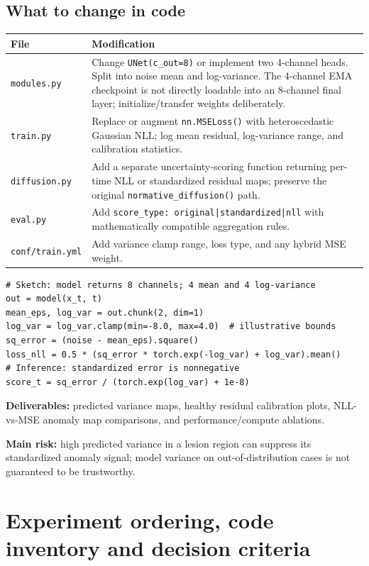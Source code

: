 \documentclass[10pt,a4paper]{article}
\newcommand{\file}[1]{\nolinkurl{#1}}
\begin{document}
\subsection{What to change in code}
\begin{tabularx}{\linewidth}{@{}p{39mm}X@{}}
\toprule File & Modification\\\midrule
\file{modules.py} & Change \file{UNet(c_out=8)} or implement two 4-channel heads. Split into noise mean and log-variance. The 4-channel EMA checkpoint is not directly loadable into an 8-channel final layer; initialize/transfer weights deliberately.\\
\file{train.py} & Replace or augment \file{nn.MSELoss()} with heteroscedastic Gaussian NLL; log mean residual, log-variance range, and calibration statistics.\\
\file{diffusion.py} & Add a separate uncertainty-scoring function returning per-time NLL or standardized residual maps; preserve the original \file{normative_diffusion()} path.\\
\file{eval.py} & Add \file{score_type: original|standardized|nll} with mathematically compatible aggregation rules.\\
\file{conf/train.yml} & Add variance clamp range, loss type, and any hybrid MSE weight.\\\bottomrule
\end{tabularx}
\begin{lstlisting}
# Sketch: model returns 8 channels; 4 mean and 4 log-variance
out = model(x_t, t)
mean_eps, log_var = out.chunk(2, dim=1)
log_var = log_var.clamp(min=-8.0, max=4.0)  # illustrative bounds
sq_error = (noise - mean_eps).square()
loss_nll = 0.5 * (sq_error * torch.exp(-log_var) + log_var).mean()
# Inference: standardized error is nonnegative
score_t = sq_error / (torch.exp(log_var) + 1e-8)
\end{lstlisting}
\textbf{Deliverables:} predicted variance maps, healthy residual calibration plots, NLL-vs-MSE anomaly map comparisons, and performance/compute ablations.\par
\textbf{Main risk:} high predicted variance in a lesion region can suppress its standardized anomaly signal; model variance on out-of-distribution cases is not guaranteed to be trustworthy.
\section{Experiment ordering, code inventory and decision criteria}
\end{document}
